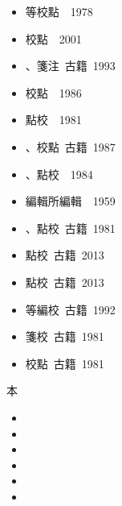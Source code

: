 \begin{enumerate}
\begin{itemize}
        \item {}等校點\ {\small {}\ 1978}
        \item {}校點\ {\small {}\ 2001}
        \item {}、箋注\ {\small {}古籍\ 1993}
        \item {}校點\ {\small {}\ 1986}
        \item {}點校\ {\small {}\ 1981}
        \item {}、校點\ {\small {}古籍\ 1987}
        \item {}、點校\ {\small {}\ 1984}
        \item {}編輯所編輯\ {\small {}\ 1959}
        \item {}、點校\ {\small {}古籍\ 1981}
        \item {}點校\ {\small {}古籍\ 2013}
        \item {}點校\ {\small {}古籍\ 2013}
        \item {}等編校\ {\small {}古籍\ 1992}
        \item {}箋校\ {\small {}古籍\ 1981}
        \item {}校點\ {\small {}古籍\ 1981}
    \end{itemize}
    本
    \begin{itemize}
        \item {}
        \item {}
        \item {}
        \item {}
        \item {}
        \item {}

\end{itemize}
\end{enumerate}
